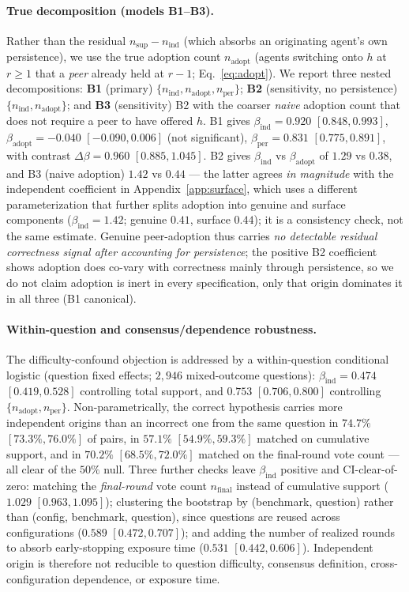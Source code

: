 \paragraph{True decomposition (models B1--B3).}
Rather than the residual $n_{\mathrm{sup}}-n_{\mathrm{ind}}$ (which absorbs an originating agent's own
persistence), we use the true adoption count $n_{\mathrm{adopt}}$ (agents switching onto $h$ at $r\ge 1$
that a \emph{peer} already held at $r-1$; Eq.~\ref{eq:adopt}). We report three nested decompositions:
\textbf{B1} (primary) $\{n_{\mathrm{ind}},n_{\mathrm{adopt}},n_{\mathrm{per}}\}$;
\textbf{B2} (sensitivity, no persistence) $\{n_{\mathrm{ind}},n_{\mathrm{adopt}}\}$; and
\textbf{B3} (sensitivity) B2 with the coarser \emph{naive} adoption count that does not require a peer to
have offered $h$. B1 gives $\beta_{\mathrm{ind}}=0.920$ $[0.848,0.993]$, $\beta_{\mathrm{adopt}}=-0.040$
$[-0.090,0.006]$ (not significant), $\beta_{\mathrm{per}}=0.831$ $[0.775,0.891]$, with contrast
$\Delta\beta=0.960$ $[0.885,1.045]$. B2 gives $\beta_{\mathrm{ind}}$ vs $\beta_{\mathrm{adopt}}$ of $1.29$ vs
$0.38$, and B3 (naive adoption) $1.42$ vs $0.44$ --- the latter agrees \emph{in magnitude} with the
independent coefficient in Appendix~\ref{app:surface}, which uses a different parameterization that further
splits adoption into genuine and surface components ($\beta_{\mathrm{ind}}=1.42$; genuine $0.41$, surface
$0.44$); it is a consistency check, not the same estimate. Genuine peer-adoption thus carries \emph{no
detectable residual correctness signal after accounting for persistence}; the positive B2 coefficient shows
adoption does co-vary with
correctness mainly through persistence, so we do not claim adoption is inert in every specification, only
that origin dominates it in all three (B1 canonical).

\paragraph{Within-question and consensus/dependence robustness.}
The difficulty-confound objection is addressed by a within-question conditional logistic (question fixed
effects; $2{,}946$ mixed-outcome questions): $\beta_{\mathrm{ind}}=0.474$ $[0.419,0.528]$ controlling total
support, and $0.753$ $[0.706,0.800]$ controlling $\{n_{\mathrm{adopt}},n_{\mathrm{per}}\}$. Non-parametrically,
the correct hypothesis carries more independent origins than an incorrect one from the same question in
$74.7\%$ $[73.3\%,76.0\%]$ of pairs, in $57.1\%$ $[54.9\%,59.3\%]$ matched on cumulative support, and in
$70.2\%$ $[68.5\%,72.0\%]$ matched on the final-round vote count --- all clear of the $50\%$ null. Three
further checks leave $\beta_{\mathrm{ind}}$ positive and CI-clear-of-zero: matching the \emph{final-round}
vote count $n_{\mathrm{final}}$ instead of cumulative support ($1.029$ $[0.963,1.095]$); clustering the
bootstrap by (benchmark, question) rather than (config, benchmark, question), since questions are reused
across configurations ($0.589$ $[0.472,0.707]$); and adding the number of realized rounds to absorb
early-stopping exposure time ($0.531$ $[0.442,0.606]$). Independent origin is therefore not reducible to
question difficulty, consensus definition, cross-configuration dependence, or exposure time.

